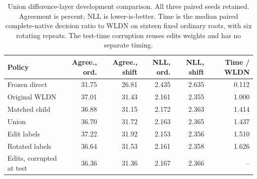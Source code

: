 \begin{table}[t]
\centering\small
\caption{Union difference-layer development comparison. All three paired seeds retained. Agreement is percent; NLL is lower-is-better. Time is the median paired complete-native decision ratio to WLDN on sixteen fixed ordinary roots, with six rotating repeats. The test-time corruption reuses edits weights and has no separate timing. \label{tab:union-difference}}
\begin{tabular}{lrrrrr}
\toprule
Policy & Agree., ord. & Agree., shift & NLL, ord. & NLL, shift & Time / WLDN \\
\midrule
Frozen direct & 31.75 & 26.81 & 2.435 & 2.635 & 0.112 \\
Original WLDN & 37.01 & 31.43 & 2.161 & 2.355 & 1.000 \\
Matched child & 36.88 & 31.15 & 2.172 & 2.363 & 1.414 \\
Union & 36.70 & 31.72 & 2.163 & 2.365 & 1.437 \\
Edit labels & 37.22 & 31.92 & 2.153 & 2.356 & 1.510 \\
Rotated labels & 36.64 & 31.53 & 2.161 & 2.358 & 1.626 \\
Edits, corrupted at test & 36.36 & 31.36 & 2.167 & 2.366 & -- \\
\bottomrule
\end{tabular}
\end{table}
